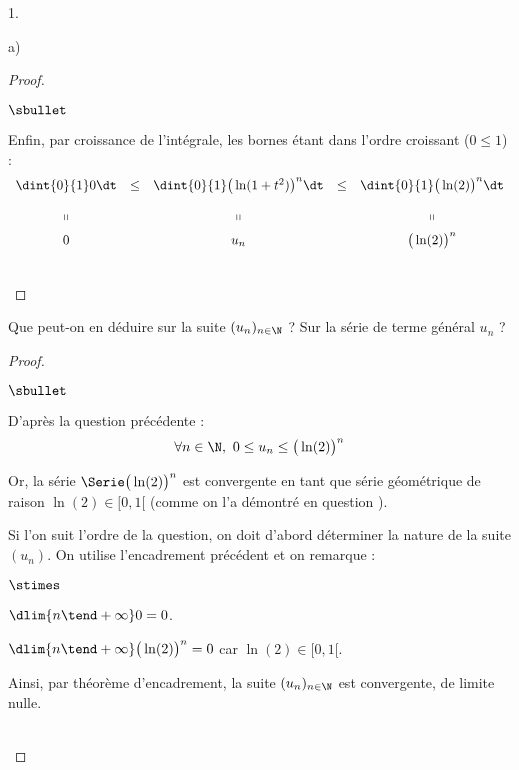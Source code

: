 \begin{noliste}{1.}
\begin{noliste}{a)}
\begin{proof}
\begin{noliste}{$\sbullet$}
        \newpage


      \item Enfin, par croissance de l'intégrale, les bornes étant
        dans l'ordre croissant ($0 \leq 1$) : 
        \[
        \begin{array}{ccccc}
          \dint{0}{1} 0 \dt & \leq & \dint{0}{1} \big( \ln(1 + t^2)
          \big)^n \dt & \leq & \dint{0}{1} \big( \ln(2) \big)^n \dt 
          \\[.4cm]
          \shortparallel & & \shortparallel & & \shortparallel
          \\[.2cm]
          0 & & u_n & & \big(\ln(2) \big)^n
        \end{array}
        \]
      \end{noliste}
      ~\\[-1cm] 
    \end{proof}

  \item Que peut-on en déduire sur la suite $(u_n)_{n \in \N}$ ? Sur
    la série de terme général $u_n$ ?

    \begin{proof}~%
      \begin{noliste}{$\sbullet$}
      \item D'après la question précédente : 
        \[
        \forall n \in \N, \ 0 \leq u_n \leq \big(\ln(2) \big)^n
        \]

      \item Or, la série $\Serie \big(\ln(2) \big)^n$ est convergente
        en tant que série géométrique de raison $\ln(2) \in [0, 1[$
        (comme on l'a démontré en question ).
      \end{noliste}
      \begin{remark}
        Si l'on suit l'ordre de la question, on doit d'abord
        déterminer la nature de la suite $(u_n)$. On utilise
        l'encadrement précédent et on remarque :
        \begin{noliste}{$\stimes$}
        \item $\dlim{n \tend +\infty} 0 = 0$.
        \item $\dlim{n \tend +\infty} \big( \ln(2) \big)^n = 0$ car
          $\ln(2) \in [0, 1[$.
        \end{noliste}
        Ainsi, par théorème d'encadrement, la suite $(u_n)_{n \in \N}$
        est convergente, de limite nulle.
      \end{remark}~\\[-1.4cm]
    \end{proof}
  \end{noliste}  


\end{noliste}
